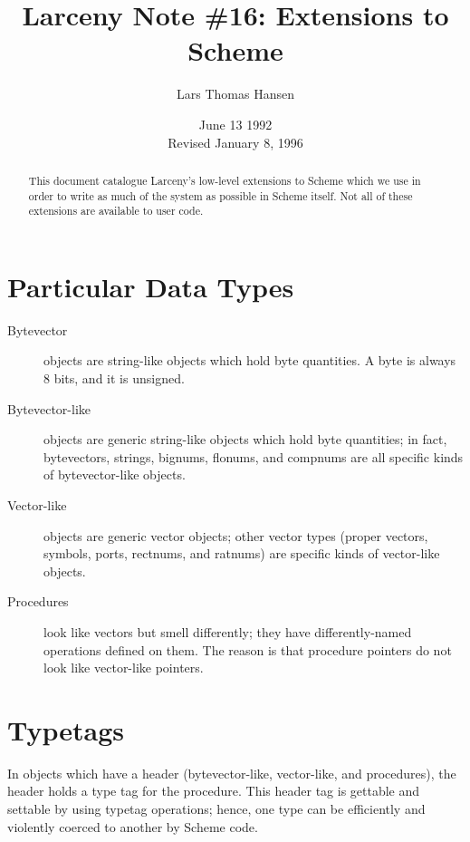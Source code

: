 %


\title{Larceny Note \#16: Extensions to Scheme}
\author{Lars Thomas Hansen}
\date{June 13 1992 \\ Revised January 8, 1996}


\maketitle

\begin{abstract}
This document catalogue Larceny's low-level extensions to Scheme
which we use in order to write as much of the system as possible in Scheme
itself. Not all of these extensions are available to user code.
\end{abstract}

\section{Particular Data Types}

\begin{description}

\item[Bytevector] objects are string-like objects which hold byte quantities.
A byte is always 8 bits, and it is unsigned.

\item[Bytevector-like] objects are generic string-like objects which hold
byte quantities; in fact, bytevectors, strings, bignums, flonums, and
compnums are all specific kinds of bytevector-like objects.

\item[Vector-like] objects are generic vector objects; other vector types
(proper vectors, symbols, ports, rectnums, and ratnums) are specific kinds of
vector-like objects.

\item[Procedures] look like vectors but smell differently; they have
differently-named operations defined on them. The reason is that procedure
pointers do not look like vector-like pointers.

\end{description}


\section{Typetags}

In objects which have a header (bytevector-like, vector-like, and procedures),
the header holds a type tag for the procedure. This header tag is gettable
and settable by using typetag operations; hence, one type can be efficiently
and violently coerced to another by Scheme code.

